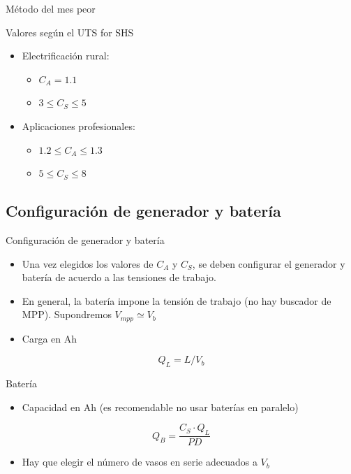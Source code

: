 \documentclass[xcolor={usenames,svgnames,dvipsnames}]{beamer}
\begin{document}
\begin{frame}[label={sec:org7f87dd6}]{Método del mes peor}
\begin{block}{Valores según el UTS for SHS}
\begin{itemize}
\item Electrificación rural:

\begin{itemize}
\item \(C_{A}=1.1\)

\item \(3\leq C_{S}\leq5\)
\end{itemize}

\item Aplicaciones profesionales:

\begin{itemize}
\item \(1.2\leq C_{A}\leq1.3\)

\item \(5\leq C_{S}\leq8\)
\end{itemize}
\end{itemize}
\end{block}
\end{frame}

\subsection{Configuración de generador y batería}
\label{sec:org6793318}
\begin{frame}[label={sec:orgef32084}]{Configuración de generador y batería}
\begin{itemize}
\item Una vez elegidos los valores de \(C_{A}\) y \(C_{S}\), se deben
configurar el generador y batería de acuerdo a las tensiones de
trabajo.

\item En general, la batería impone la tensión de trabajo (no hay buscador
de MPP). Supondremos \(V_{mpp} \simeq V_{b}\)

\item Carga en Ah
\end{itemize}
\[
Q_L = L / V_b
\]
\end{frame}

\begin{frame}[label={sec:orgab57d68}]{Batería}
\begin{itemize}
\item Capacidad en Ah (es recomendable no usar baterías en paralelo)
\end{itemize}
\[
Q_B = \frac{C_S \cdot Q_L}{PD}
\]

\begin{itemize}
\item Hay que elegir el número de vasos en serie adecuados a \(V_b\)
\end{itemize}
\end{frame}
\end{document}
